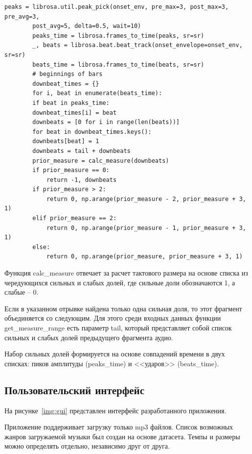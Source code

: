 \begin{lstlisting}[label={lst:measurerange}, caption={определение диапазона размеров (продолжение)}]
		peaks = librosa.util.peak_pick(onset_env, pre_max=3, post_max=3, pre_avg=3,
		post_avg=5, delta=0.5, wait=10)
		peaks_time = librosa.frames_to_time(peaks, sr=sr)
		_, beats = librosa.beat.beat_track(onset_envelope=onset_env, sr=sr)
		beats_time = librosa.frames_to_time(beats, sr=sr)
		# beginnings of bars
		downbeat_times = {}
		for i, beat in enumerate(beats_time):
		if beat in peaks_time:
		downbeat_times[i] = beat
		downbeats = [0 for i in range(len(beats))]
		for beat in downbeat_times.keys():
		downbeats[beat] = 1
		downbeats = tail + downbeats
		prior_measure = calc_measure(downbeats)
		if prior_measure == 0:
			return -1, downbeats
		if prior_measure > 2:
			return 0, np.arange(prior_measure - 2, prior_measure + 3, 1)
		elif prior_measure == 2:
			return 0, np.arange(prior_measure - 1, prior_measure + 3, 1)
		else:
			return 0, np.arange(prior_measure, prior_measure + 3, 1)
\end{lstlisting}

Функция calc\_measure отвечает за расчет тактового размера на основе списка из чередующихся сильных и слабых долей, где сильные доли обозначаются 1, а слабые -- 0.

Если в указанном отрывке найдена только одна сильная доля, то этот фрагмент объединяется со следующим. Для этого среди входных данных функции get\_measure\_range есть параметр tail, который представляет собой список сильных и слабых долей предыдущего фрагмента аудио.

Набор сильных долей формируется на основе совпадений времени в двух списках: пиков амплитуды (peaks\_time) и <<ударов>> (beats\_time).

\subsection{Пользовательский интерфейс}

На рисунке~\ref{img:gui} представлен интерфейс разработанного приложения.

Приложение поддерживает загрузку только mp3 файлов. Список возможных жанров загружаемой музыки был создан на основе датасета. Темпы и размеры можно определять отдельно, независимо друг от друга.

